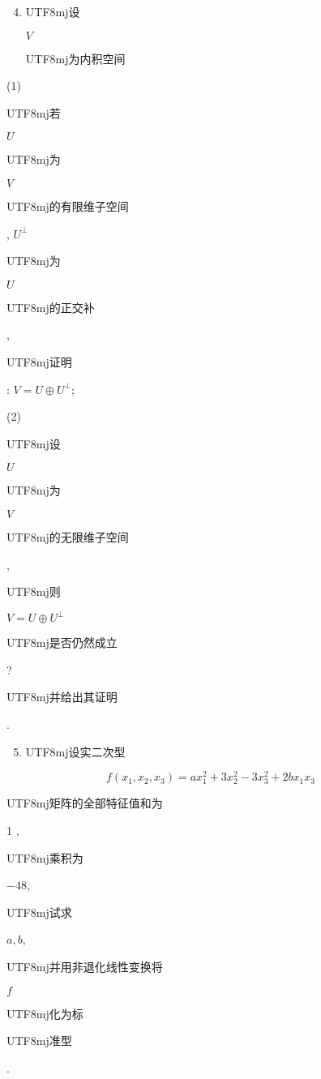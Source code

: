 \documentclass[10pt]{article}
\begin{document}
\begin{enumerate}
  \setcounter{enumi}{3}
  \item \begin{CJK}{UTF8}{mj}设\end{CJK} $V$ \begin{CJK}{UTF8}{mj}为内积空间\end{CJK}
\end{enumerate}
(1) \begin{CJK}{UTF8}{mj}若\end{CJK} $U$ \begin{CJK}{UTF8}{mj}为\end{CJK} $V$ \begin{CJK}{UTF8}{mj}的有限维子空间\end{CJK}, $U^{\perp}$ \begin{CJK}{UTF8}{mj}为\end{CJK} $U$ \begin{CJK}{UTF8}{mj}的正交补\end{CJK}, \begin{CJK}{UTF8}{mj}证明\end{CJK}: $V=U \oplus U^{\perp}$;

(2) \begin{CJK}{UTF8}{mj}设\end{CJK} $U$ \begin{CJK}{UTF8}{mj}为\end{CJK} $V$ \begin{CJK}{UTF8}{mj}的无限维子空间\end{CJK}, \begin{CJK}{UTF8}{mj}则\end{CJK} $V=U \oplus U^{\perp}$ \begin{CJK}{UTF8}{mj}是否仍然成立\end{CJK}? \begin{CJK}{UTF8}{mj}并给出其证明\end{CJK}.

\begin{enumerate}
  \setcounter{enumi}{4}
  \item \begin{CJK}{UTF8}{mj}设实二次型\end{CJK}
\end{enumerate}
$$
f\left(x_{1}, x_{2}, x_{3}\right)=a x_{1}^{2}+3 x_{2}^{2}-3 x_{3}^{2}+2 b x_{1} x_{3}
$$
\begin{CJK}{UTF8}{mj}矩阵的全部特征值和为\end{CJK} 1 , \begin{CJK}{UTF8}{mj}乘积为\end{CJK} $-48$, \begin{CJK}{UTF8}{mj}试求\end{CJK} $a, b$, \begin{CJK}{UTF8}{mj}并用非退化线性变换将\end{CJK} $f$ \begin{CJK}{UTF8}{mj}化为标\end{CJK} \begin{CJK}{UTF8}{mj}准型\end{CJK}.
\end{document}
